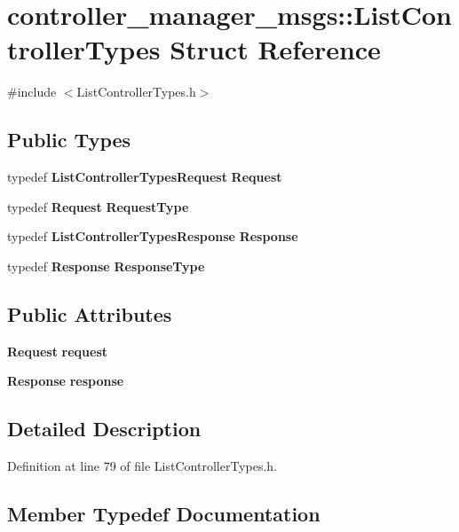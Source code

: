 \section{controller\-\_\-manager\-\_\-msgs\-:\-:\-List\-Controller\-Types \-Struct \-Reference}
\label{structcontroller__manager__msgs_1_1ListControllerTypes}


{\ttfamily \#include $<$\-List\-Controller\-Types.\-h$>$}

\subsection*{\-Public \-Types}
\begin{DoxyCompactItemize}
\item 
typedef {\bf \-List\-Controller\-Types\-Request} {\bf \-Request}
\item 
typedef {\bf \-Request} {\bf \-Request\-Type}
\item 
typedef {\bf \-List\-Controller\-Types\-Response} {\bf \-Response}
\item 
typedef {\bf \-Response} {\bf \-Response\-Type}
\end{DoxyCompactItemize}
\subsection*{\-Public \-Attributes}
\begin{DoxyCompactItemize}
\item 
{\bf \-Request} {\bf request}
\item 
{\bf \-Response} {\bf response}
\end{DoxyCompactItemize}


\subsection{\-Detailed \-Description}


\-Definition at line 79 of file \-List\-Controller\-Types.\-h.



\subsection{\-Member \-Typedef \-Documentation}
